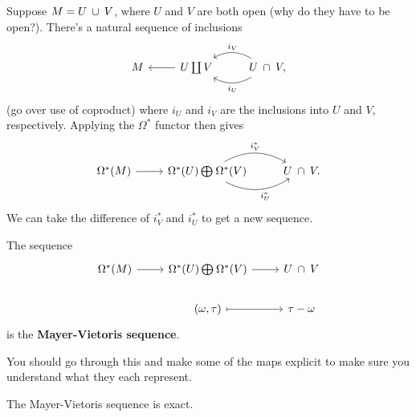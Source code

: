 \documentclass[twoside,10pt]{report}
\begin{document}
Suppose $M = U \operatorname{\;\cup\;} V$, where $U$ and $V$ are both open {\color{red}(why do they have to be open?)}. There's a natural sequence of inclusions
\[
\begin{tikzcd}
	M&U \coprod V \lar & U \isct V\lar[bend left]{i_{U}}\arrow[l, bend right, "i_{V}"'],
\end{tikzcd}
\] {\color{red}(go over use of coproduct)} where $i_{U}$ and $i_{V}$ are the inclusions into $U$ and $V$, respectively. Applying the $\Omega^{*}$ functor then gives
\[
\begin{tikzcd}
	\Omega^{*}(M) \rar & \Omega^{*}(U) \bigoplus_{}\Omega^{*}(V) \rar[bend left]{i_{V}^*}\arrow[r, bend right, "i_{U}^*"'] & U \isct V.
\end{tikzcd}
\] We can take the difference of $i_{V}^{*}$ and $i_{U}^{*}$ to get a new sequence.

\begin{defn}[]
The sequence
\[
\begin{tikzcd}
        \Omega^{*}(M) \rar & \Omega^{*}(U) \bigoplus_{}\Omega^{*}(V) \rar & U \isct V\\
			   & (\omega, \tau) \rar[maps to]&\tau-\omega
\end{tikzcd}
\] 
is the \textbf{Mayer-Vietoris sequence}.
\end{defn}
{\color{red}You should go through this and make some of the maps explicit to make sure you understand what they each represent.}

\begin{thrm}[]
The Mayer-Vietoris sequence is exact.
\end{thrm}
\end{document}

